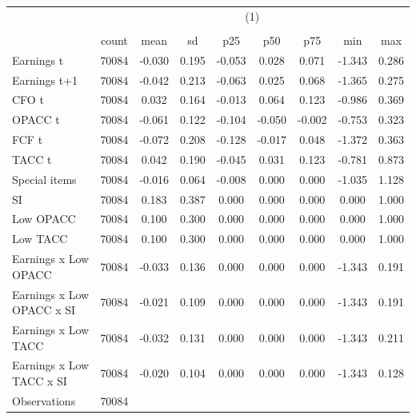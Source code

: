 {
\def\sym#1{\ifmmode^{#1}\else\(^{#1}\)\fi}
\begin{tabular}{l*{1}{cccccccc}}
\hline\hline
                    &\multicolumn{8}{c}{(1)}                                                                                \\
                    &\multicolumn{8}{c}{}                                                                                   \\
                    &       count&        mean&          sd&         p25&         p50&         p75&         min&         max\\
\hline
Earnings t          &       70084&      -0.030&       0.195&      -0.053&       0.028&       0.071&      -1.343&       0.286\\
Earnings t+1        &       70084&      -0.042&       0.213&      -0.063&       0.025&       0.068&      -1.365&       0.275\\
CFO t               &       70084&       0.032&       0.164&      -0.013&       0.064&       0.123&      -0.986&       0.369\\
OPACC t             &       70084&      -0.061&       0.122&      -0.104&      -0.050&      -0.002&      -0.753&       0.323\\
FCF t               &       70084&      -0.072&       0.208&      -0.128&      -0.017&       0.048&      -1.372&       0.363\\
TACC t              &       70084&       0.042&       0.190&      -0.045&       0.031&       0.123&      -0.781&       0.873\\
Special items       &       70084&      -0.016&       0.064&      -0.008&       0.000&       0.000&      -1.035&       1.128\\
SI                  &       70084&       0.183&       0.387&       0.000&       0.000&       0.000&       0.000&       1.000\\
Low OPACC           &       70084&       0.100&       0.300&       0.000&       0.000&       0.000&       0.000&       1.000\\
Low TACC            &       70084&       0.100&       0.300&       0.000&       0.000&       0.000&       0.000&       1.000\\
Earnings x Low OPACC&       70084&      -0.033&       0.136&       0.000&       0.000&       0.000&      -1.343&       0.191\\
Earnings x Low OPACC x SI&       70084&      -0.021&       0.109&       0.000&       0.000&       0.000&      -1.343&       0.191\\
Earnings x Low TACC &       70084&      -0.032&       0.131&       0.000&       0.000&       0.000&      -1.343&       0.211\\
Earnings x Low TACC x SI&       70084&      -0.020&       0.104&       0.000&       0.000&       0.000&      -1.343&       0.128\\
\hline
Observations        &       70084&            &            &            &            &            &            &            \\
\hline\hline
\end{tabular}
}
